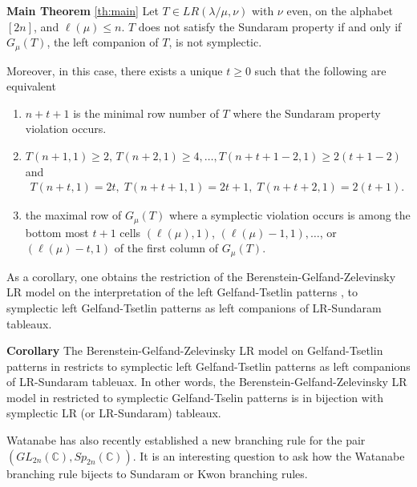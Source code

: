 \documentclass[reqno]{amsart}
\theoremstyle{tplain}
\begin{document}
{\textbf{Main Theorem} \ref{th:main} Let $T\in LR(\lambda/\mu,\nu)$ with $\nu$ even, on the alphabet $[2n]$, and $ \ell(\mu)\le n$.
 $T$ does not satisfy the Sundaram property if and only if $G_\mu(T)$, the left companion of $T$, is not symplectic.

Moreover,  in this case, there exists a unique $t\ge 0$ such that the following are equivalent
\begin{enumerate}

\item  ${n+t+1}$  is  the minimal row number of $T$ where the  Sundaram property  violation occurs.

\item $T(n+1,1)\ge 2,\, T(n+2,1)\ge 4,\dots, T(n+t+1-2,1)\ge 2(t+1-2)$ and
  \begin{align*}T(n+t,1)=2t,\; T(n+t+1,1)= 2t+1,\; T(n+t+2,1)=2(t+1).\qquad\qquad\qquad\qquad\qquad\quad %
 \end{align*}
 \item  the maximal row    of $G_\mu(T)$ where a symplectic violation  occurs is among the bottom most $t+1$ cells  $(\ell(\mu),1)$,  $(\ell(\mu)-1,1),\dots$, or $ (\ell(\mu)-t,1) $ of the first column of $G_\mu(T)$.
\end{enumerate}

As a corollary, one obtains  the restriction of the Berenstein-Gelfand-Zelevinsky LR model on the interpretation of the left Gelfand-Tsetlin patterns \cite[Theorem 4.3]{BZphy}, to symplectic left Gelfand-Tsetlin patterns as left companions of LR-Sundaram tableaux.

{\textbf{Corollary} The Berenstein-Gelfand-Zelevinsky LR model on  Gelfand-Tsetlin patterns in \cite[Theorem]{BZphy} restricts to symplectic left Gelfand-Tsetlin patterns as left companions of LR-Sundaram tableuax. In other words, the Berenstein-Gelfand-Zelevinsky LR model in \cite[Theorem 4.3]{BZphy} restricted to symplectic Gelfand-Tselin patterns is in bijection with symplectic LR  (or LR-Sundaram) tableaux.
}
\medskip

Watanabe \cite{watanabe} has also recently    established a new branching rule for the pair   $(GL_{2n}(\mathbb{C}), Sp_{2n}(\mathbb{C}))$. It is an
interesting question to ask  how the Watanabe branching rule bijects  to Sundaram or Kwon branching rules.

}
\end{document}
